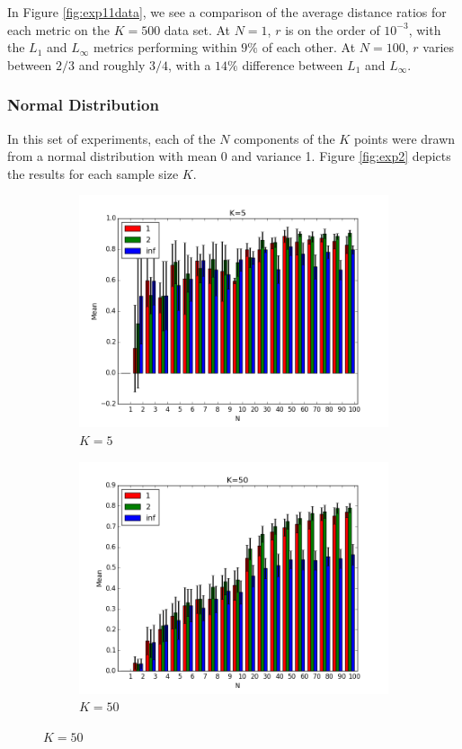 \documentclass{article}
\begin{document}
In Figure \ref{fig:exp11data}, we see a comparison of the average distance ratios for each metric on the $K=500$ data set. At $N=1$, $r$ is on the order of $10^{-3}$, with the $L_1$ and $L_{\infty}$ metrics performing within $9\%$ of each other. At $N=100$, $r$ varies between $2/3$ and roughly $3/4$, with a $14\%$ difference between $L_1$ and $L_{\infty}$.
\subsubsection{Normal Distribution}
In this set of experiments, each of the $N$ components of the $K$ points were drawn from a normal distribution with mean 0 and variance 1. Figure \ref{fig:exp2} depicts the results for each sample size $K$.
\begin{figure}[H]
    \centering
    \begin{subfigure}[h]{0.45\textwidth}
        \includegraphics[width=\textwidth]{l-experiment2-5-inf.png}
        \caption{$K=5$}
        \label{fig:exp2k5}
    \end{subfigure}
   \begin{subfigure}[h]{0.45\textwidth}
        \includegraphics[width=\textwidth]{l-experiment2-50-inf.png}
        \caption{$K=50$}
        \label{fig:exp2k50}
    \end{subfigure}
   \centering
\end{figure}
\end{document}
